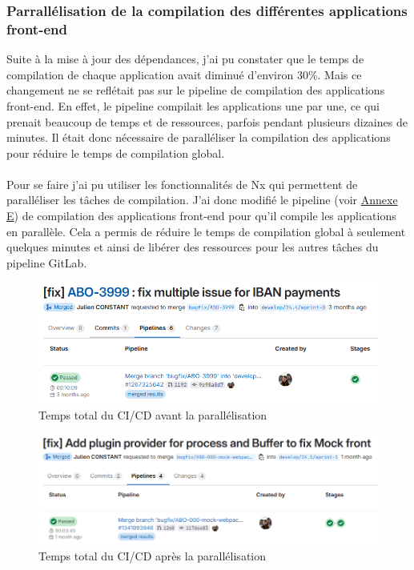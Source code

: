 \documentclass[12pt, a4paper]{report}
\begin{document}
	\newpage
	\subsubsection{Parrallélisation de la compilation des différentes applications front-end}
	
	Suite à la mise à jour des dépendances, j'ai pu constater que le temps de compilation de chaque application avait diminué d'environ 30\%. Mais ce changement ne se reflétait pas sur le pipeline de compilation des applications front-end. En effet, le pipeline compilait les applications une par une, ce qui prenait beaucoup de temps et de ressources, parfois pendant plusieurs dizaines de minutes. Il était donc nécessaire de paralléliser la compilation des applications pour réduire le temps de compilation global.
	\\\\
	Pour se faire j'ai pu utiliser les fonctionnalités de Nx qui permettent de paralléliser les tâches de compilation. J'ai donc modifié le pipeline (voir \hyperref[sec:ci-cd_gitlab]{Annexe E}) de compilation des applications front-end pour qu'il compile les applications en parallèle. Cela a permis de réduire le temps de compilation global à seulement quelques minutes et ainsi de libérer des ressources pour les autres tâches du pipeline GitLab.
	\\

	\begin{figure}[!h]
		\centering
		\includegraphics[width=1\textwidth]{assets/images/build_pipeline_before.png}
		\vspace{-.6cm}
		\caption{Temps total du CI/CD avant la parallélisation}
	\end{figure}

	\begin{figure}[!h]
		\centering
		\includegraphics[width=1\textwidth]{assets/images/build_pipeline_after.png}
		\vspace{-.6cm}
		\caption{Temps total du CI/CD après la parallélisation}
	\end{figure}
	
\end{document}
